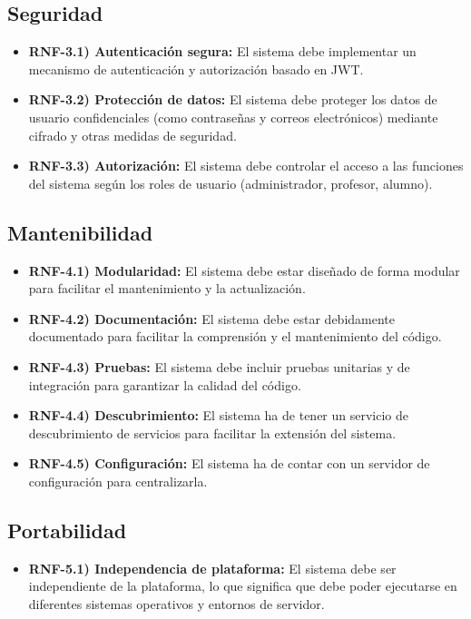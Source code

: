 \subsection{Seguridad}

\begin{itemize}
    \item \textbf{RNF-3.1) Autenticación segura:} El sistema debe implementar un mecanismo de autenticación y autorización basado en JWT.
    \item \textbf{RNF-3.2) Protección de datos:} El sistema debe proteger los datos de usuario confidenciales (como contraseñas y correos electrónicos) mediante cifrado y otras medidas de seguridad.
    \item \textbf{RNF-3.3) Autorización:} El sistema debe controlar el acceso a las funciones del sistema según los roles de usuario (administrador, profesor, alumno).
\end{itemize}

\subsection{Mantenibilidad}

\begin{itemize}
    \item \textbf{RNF-4.1) Modularidad:} El sistema debe estar diseñado de forma modular para facilitar el mantenimiento y la actualización.
    \item \textbf{RNF-4.2) Documentación:} El sistema debe estar debidamente documentado para facilitar la comprensión y el mantenimiento del código.
    \item \textbf{RNF-4.3) Pruebas:} El sistema debe incluir pruebas unitarias y de integración para garantizar la calidad del código.
    \item \textbf{RNF-4.4) Descubrimiento:} El sistema ha de tener un servicio de descubrimiento de servicios para facilitar la extensión del sistema.
    \item \textbf{RNF-4.5) Configuración:} El sistema ha de contar con un servidor de configuración para centralizarla.
\end{itemize}

\subsection{Portabilidad}

\begin{itemize}
    \item \textbf{RNF-5.1) Independencia de plataforma:} El sistema debe ser independiente de la plataforma, lo que significa que debe poder ejecutarse en diferentes sistemas operativos y entornos de servidor.
\end{itemize}

